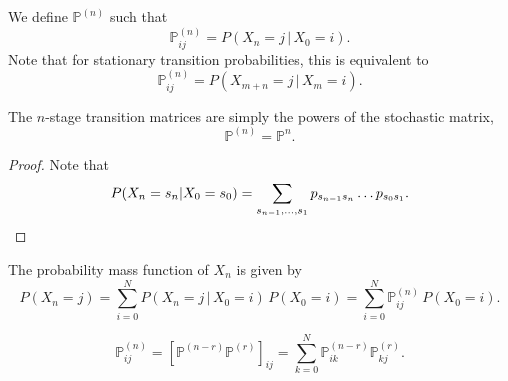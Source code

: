 \documentclass[11pt]{article}
\def\mP{\mathbb{P}}
\theoremstyle{definition}
\theoremstyle{remark}
\numberwithin{equation}{module}
\begin{document}
    \begin{definition}
        We define $\mP^{(n)}$ such that \[
            \mP^{(n)}_{ij} = P(X_n = j \,|\, X_0 = i).
        \] Note that for stationary transition probabilities, this is equivalent to
        \[
            \mP^{(n)}_{ij} = P(X_{m + n} = j \,|\, X_m = i).
        \] 
    \end{definition}
    \begin{lemma}
        The $n$-stage transition matrices are simply the powers of the stochastic
        matrix, \[
            \mP^{(n)} = \mP^n.
        \] 
    \end{lemma}
    \begin{proof}
        Note that \[
            P(X_n = s_n | X_0 = s_0)  = \sum_{s_{n - 1}, \dots, s_{1}} p_{s_{n -
            1}s_n} \dots p_{s_0 s_1}. \qedhere
        \] 
    \end{proof}
    \begin{lemma}
        The probability mass function of $X_n$ is given by \[
            P(X_n = j) = \sum_{i = 0}^N P(X_n = j \,|\, X_0 = i)\,P(X_0 = i) = 
            \sum_{i = 0}^N \mP_{ij}^{(n)} \,P(X_0 = i).
        \] 
    \end{lemma}

    \begin{theorem}
        \[
            \mP^{(n)}_{ij} = \left[\mP^{(n - r)}\mP^{(r)}\right]_{ij} = \sum_{k = 0}^N
            \mP^{(n - r)}_{ik}\mP^{(r)}_{kj}.
        \] 
    \end{theorem}
\end{document}
